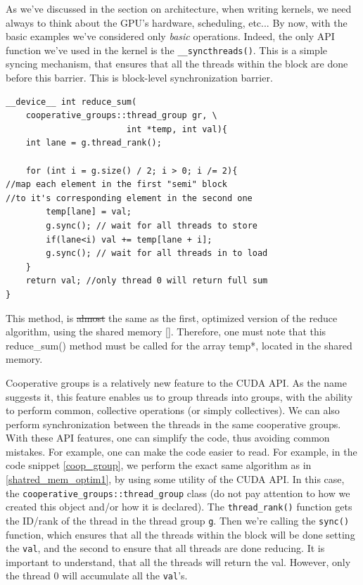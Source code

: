 \documentclass[12pt]{article}
\begin{document}
As we've discussed in the section on architecture, when writing kernels, we need always to think about the GPU's hardware, scheduling, etc...
By now, with the basic examples we've considered only \textit{basic} operations. Indeed, the only API function we've used in the kernel is the \verb|__syncthreads()|. 
This is a simple syncing mechanism, that ensures that all the threads within the block are 
done before this barrier. This is block-level synchronization barrier.


\begin{listing}
\begin{verbatim}
__device__ int reduce_sum(
    cooperative_groups::thread_group gr, \
                        int *temp, int val){
    int lane = g.thread_rank();

    for (int i = g.size() / 2; i > 0; i /= 2){ 
//map each element in the first "semi" block 
//to it's corresponding element in the second one
        temp[lane] = val;
        g.sync(); // wait for all threads to store
        if(lane<i) val += temp[lane + i];
        g.sync(); // wait for all threads in to load
    }
    return val; //only thread 0 will return full sum
}
\end{verbatim}
\label{coop_group}
    \caption{This method, is \sout{almost} the same as the first, optimized version of the reduce 
    algorithm, using the shared memory \autoref{}. Therefore, one must note that this reduce\_sum() method 
    must be called for the array temp*, located in the shared memory.}
\end{listing}


Cooperative groups is a relatively new feature to the CUDA API.
As the name suggests it, this feature enables us to group threads into groups, with the 
ability to perform common, collective operations (or simply collectives). We can also 
perform synchronization between the threads in the same cooperative groups. 
With these API features, one can simplify the code, thus avoiding common mistakes.
For example, one can make the code easier to read. For example, in the code snippet 
\autoref{coop_group}, we perform the exact same algorithm as in \autoref{shatred_mem_optim1},
by using some utility of the CUDA API. In this case, the \verb|cooperative_groups::thread_group|
class (do not pay attention to how we created this object and/or how it is declared).
The \verb|thread_rank()| function gets the ID/rank of the thread in the thread group \verb|g|.
Then we're calling the \verb|sync()| function, which ensures that all the threads within the
block will be done setting the \verb|val|, and the second to ensure that all threads are done reducing. It is important to understand, that all the threads will return the val. 
However, only the thread 0 will accumulate all the \verb|val|'s.\cite{blog_2020}
\end{document}
